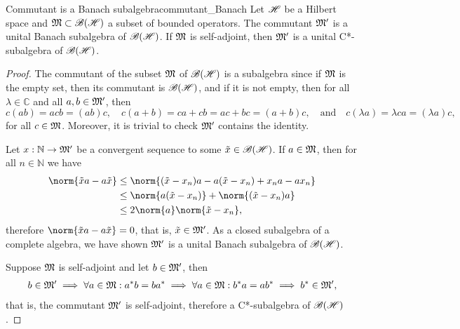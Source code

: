 \begin{proposition}{Commutant is a Banach subalgebra}{commutant_Banach}
    Let \(\mathscr{H}\) be a Hilbert space and \(\mathfrak{M} \subset \mathscr{B}(\mathscr{H})\) a subset of bounded operators. The commutant \(\mathfrak{M}'\) is a unital Banach subalgebra of \(\mathscr{B}(\mathscr{H})\). If \(\mathfrak{M}\) is self-adjoint, then \(\mathfrak{M}'\) is a unital C*-subalgebra of \(\mathscr{B}(\mathscr{H})\).
\end{proposition}
\begin{proof}
    The commutant of the subset \(\mathfrak{M}\) of \(\mathscr{B}(\mathscr{H})\) is a subalgebra since if \(\mathfrak{M}\) is the empty set, then its commutant is \(\mathscr{B}(\mathscr{H})\), and if it is not empty, then for all \(\lambda \in \mathbb{C}\) and all \(a,b \in \mathfrak{M}'\), then
    \begin{equation*}
        c(ab) = acb = (ab)c,\quad
        c(a+b) = ca + cb = ac + bc = (a+b)c,\quad\text{and}\quad
        c(\lambda a) = \lambda ca = (\lambda a)c,
    \end{equation*}
    for all \(c \in \mathfrak{M}\). Moreover, it is trivial to check \(\mathfrak{M}'\) contains the identity.

    Let \(x : \mathbb{N} \to \mathfrak{M}'\) be a convergent sequence to some \(\tilde{x} \in \mathscr{B}(\mathscr{H})\). If \(a \in \mathfrak{M}\), then for all \(n \in \mathbb{N}\) we have
    \begin{align*}
        \norm{\tilde{x}a - a\tilde{x}} &\leq \norm{(\tilde{x} - x_n)a - a(\tilde{x} - x_n) + x_na - a x_n} \\
                                       &\leq \norm{a(\tilde{x} - x_n)} + \norm{(\tilde{x}- x_n)a} \\
                                       &\leq 2\norm{a} \norm{\tilde{x} - x_n},
    \end{align*}
    therefore \(\norm{\tilde{x} a - a\tilde{x}} = 0\), that is, \(\tilde{x} \in \mathfrak{M}'\). As a closed subalgebra of a complete algebra, we have shown \(\mathfrak{M}'\) is a unital Banach subalgebra of \(\mathscr{B}(\mathscr{H})\).

    Suppose \(\mathfrak{M}\) is self-adjoint and let \(b \in \mathfrak{M}'\), then
    \begin{align*}
        b \in \mathfrak{M}' \implies \forall a \in \mathfrak{M} : a^*b = ba^* \implies \forall a \in \mathfrak{M} : b^*a = ab^* \implies b^* \in \mathfrak{M}',
    \end{align*}
    that is, the commutant \(\mathfrak{M}'\) is self-adjoint, therefore a C*-subalgebra of \(\mathscr{B}(\mathscr{H})\).
\end{proof}

